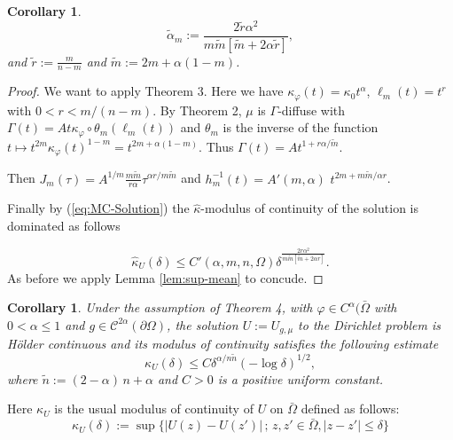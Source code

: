 \documentclass[12pt]{amsart}
\newtheorem{corollary}[theorem]{Corollary}
\theoremstyle{definition}
\numberwithin{theorem}{section}
\numberwithin{equation}{section}
\begin{document}
{\begin{corollary}
 \begin{equation} \label{eq:Holderexp}
 \tilde \alpha_m := \frac{ 2 \tilde r   \alpha^2}{ m \tilde{m} \left[ \tilde m   + 2 \alpha \tilde r\right]},
 \end{equation}
and  $ \tilde r:= \frac{m}{n-m}$ and $\tilde m := 2 m + \alpha(1-m)$.
 \end{corollary}

 \begin{proof}  We want to apply  Theorem 3.  Here we have $\kappa_\varphi (t) = \kappa_0 t^\alpha$, $\ell_m (t) = t^{r}$ with $0 < r < m \slash (n-m)$. By Theorem 2, $\mu$ is $\Gamma$-diffuse with $\Gamma (t) = A t  \kappa_\varphi \circ \theta_m \left(\ell_m (t)\right)$ and $\theta_m$ is the inverse  of the function $t \longmapsto t^{2m} \kappa_\varphi (t)^{1 - m} = t^{2m + \alpha (1-m)}$. Thus $\Gamma (t) = A  t^{1 + r \alpha \slash \tilde m}$.
 
 
 Then $ J_m (\tau) = A^{1\slash m} \frac{ m \tilde m}{r \alpha} \tau^{ \alpha r \slash m \tilde m} $ and 
 $h^{-1}_m (t) =A' (m,\alpha)  \, \,  t^{2 m +  m \tilde m \slash  \alpha r}$.  
 
 Finally  by (\ref{eq:MC-Solution}) the $\widehat{\kappa}$-modulus of continuity of the solution is dominated as follows 
 
$$
\widehat{\kappa}_U (\delta) \leq  C'(\alpha,m,n,\Omega) \delta^{\frac{2  r \alpha^2 }{ m \tilde m \left[  \tilde m + 2 \alpha  r \right]}}. 
 $$ 
 As before  we apply Lemma \ref{lem:sup-mean} to concude.  \end{proof}
 
 \begin{corollary}  \label{cor:HolderMA} Under the assumption of Theorem 4, with $\varphi \in C^\alpha (\bar{\Omega}$ with $0 < \alpha \leq 1$ and $g \in \mathcal{C}^{2 \alpha} (\partial \Omega)$,  the solution $U := U_{g,\mu}$ to the Dirichlet problem is H\"older continuous and its modulus of continuity satisfies the  following  estimate
$$
\kappa_U (\delta) \leq C \delta^{\alpha \slash n \tilde n} (- \log \delta)^{1\slash 2},
$$  
where $\tilde n := ( 2-\alpha) \,  n + \alpha $ and $C > 0$ is a positive uniform constant. 
   \end{corollary}
Here $\kappa_U$ is the usual modulus of continuity of $U$ on $\bar{\Omega}$ defined as follows:
\begin{equation}
\kappa_U(\delta) := \sup \{ \vert U (z) - U(z') \vert \, ; \, z, z' \in  \bar{\Omega}, \vert z - z'\vert \leq \delta\}%
\end{equation}

}
\end{document}
